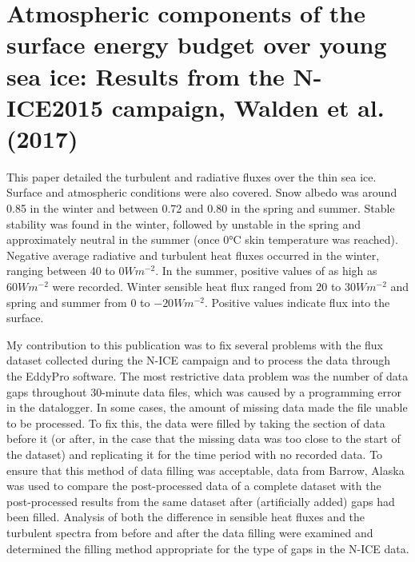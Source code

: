 \section{Atmospheric components of the surface energy budget over young sea ice: Results from the N-ICE2015 campaign, Walden et al. (2017)}

This paper detailed the turbulent and radiative fluxes over the thin sea ice. Surface and atmospheric conditions were also covered. Snow albedo was around 0.85 in the winter and between 0.72 and 0.80 in the spring and summer. Stable stability was found in the winter, followed by unstable in the spring and approximately neutral in the summer (once 0°C skin temperature was reached). Negative average radiative and turbulent heat fluxes occurred in the winter, ranging between 40 to $0 Wm^{-2}$. In the summer, positive values of as high as $60 Wm^{-2}$ were recorded. Winter sensible heat flux ranged from $20$ to $30 Wm^{-2}$ and spring and summer from 0 to $-20 Wm^{-2}$. Positive values indicate flux into the surface.

My contribution to this publication was to fix several problems with the flux dataset collected during the N-ICE campaign and to process the data through the EddyPro software. The most restrictive data problem was the number of data gaps throughout 30-minute data files, which was caused by a programming error in the datalogger. In some cases, the amount of missing data made the file unable to be processed. To fix this, the data were filled by taking the section of data before it (or after, in the case that the missing data was too close to the start of the dataset) and replicating it for the time period with no recorded data. To ensure that this method of data filling was acceptable, data from Barrow, Alaska was used to compare the post-processed data of a complete dataset with the post-processed results from the same dataset after (artificially added) gaps had been filled. Analysis of both the difference in sensible heat fluxes and the turbulent spectra from before and after the data filling were examined and determined the filling method appropriate for the type of gaps in the N-ICE data. 